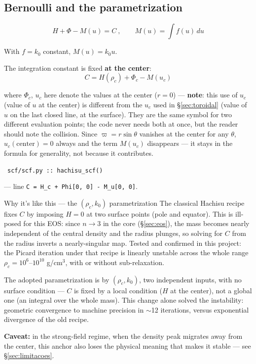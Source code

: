\documentclass[11pt,a4paper]{scrartcl}
\newcommand{\arrowto}[1]{%
  \par\vspace{2pt}\noindent{\color{linkblue}$\rightarrow$}~\texttt{\small #1}\par\vspace{2pt}}
\newcommand{\code}[1]{\texttt{\small #1}}
\begin{document}
\subsection{Bernoulli and the parametrization}
\label{sec:bernoulli}

\begin{equation}
H + \Phi - M(u) = C\ , \qquad M(u) = \int f(u)\,du
\end{equation}

With $f=k_0$ constant, $M(u)=k_0u$.

The integration constant is fixed \textbf{at the center}:
\begin{equation}
C = H(\rho_c) + \Phi_c - M(u_c)
\end{equation}

where $\Phi_c$, $u_c$ here denote the values at the center ($r=0$) ---
\textbf{note}: this use of $u_c$ (value of $u$ at the center) is
different from the $u_c$ used in \S\ref{sec:toroidal} (value of $u$ on
the last closed line, at the surface). They are the same symbol for two
different evaluation points; the code never needs both at once, but the
reader should note the collision. Since $\varpi=r\sin\theta$ vanishes at
the center for any $\theta$, $u_c(\text{center})=0$ always and the term
$M(u_c)$ disappears --- it stays in the formula for generality, not
because it contributes.

\arrowto{scf/scf.py :: hachisu\_scf()} --- line \code{C = H\_c + Phi[0, 0] - M\_u[0, 0]}.

\begin{whybox}{Why it's like this --- the $(\rho_c, k_0)$ parametrization}
The classical Hachisu recipe fixes $C$ by imposing $H=0$ at two surface
points (pole and equator). This is ill-posed for this EOS: since $n\to3$
in the core (\S\ref{sec:eos}), the mass becomes nearly independent of the
central density and the radius plunges, so solving for $C$ from the
radius inverts a nearly-singular map. Tested and confirmed in this
project: the Picard iteration under that recipe is linearly unstable
across the whole range $\rho_c=10^6$--$10^{10}$ g/cm$^3$, with or without
sub-relaxation.

The adopted parametrization is by \textbf{$(\rho_c, k_0)$}, two
independent inputs, with no surface condition --- $C$ is fixed by a local
condition ($H$ at the center), not a global one (an integral over the
whole mass). This change alone solved the instability: geometric
convergence to machine precision in $\sim$12 iterations, versus
exponential divergence of the old recipe.

\smallskip
\textbf{Caveat:} in the strong-field regime, when the density peak
migrates away from the center, this anchor also loses the physical
meaning that makes it stable --- see \S\ref{sec:limitacoes}.
\end{whybox}
\end{document}
